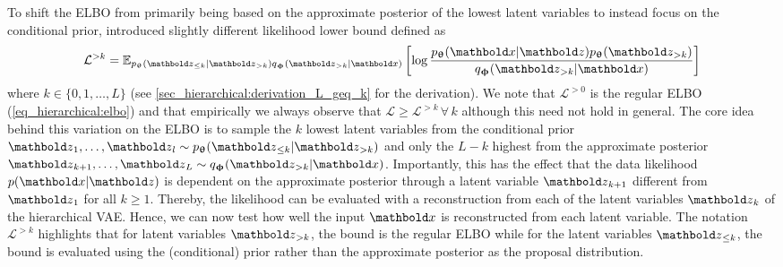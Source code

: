 {To shift the ELBO from primarily being based on the approximate posterior of the lowest latent variables to instead focus on the conditional prior, \textcite{maaloe_biva_2019} introduced slightly different likelihood lower bound defined as
\begin{equation}\label{eq_hierarchical:biva->k}
    \mathcal{L}^{>k} = \mathbb{E}_{p_\thetab(\zb_{\leq k}|\zb_{>k}) q_\phib(\zb_{>k}|\xb)} \left[ \log \frac{p_\thetab(\xb|\zb)p_\thetab(\zb_{>k})}{q_\phib(\zb_{>k}|\xb)} \right]
\end{equation}
where $k\in\{0,1,\dots,L\}$ (see \cref{sec_hierarchical:derivation_L_geq_k} for the derivation).
We note that $\mathcal{L}^{>0}$ is the regular ELBO (\cref{eq_hierarchical:elbo}) and that empirically we always observe that $\mathcal{L}\geq\mathcal{L}^{>k} \, \forall \, k$ although this need not hold in general.
The core idea behind this variation on the ELBO is to sample the $k$ lowest latent variables from the conditional prior $\zb_1,\dots,\zb_l \sim p_\thetab(\zb_{\leq k}|\zb_{>k})$ and only the $L-k$ highest from the approximate posterior $\zb_{k+1},\dots,\zb_L \sim q_\phib(\zb_{>k}|\xb)$.
Importantly, this has the effect that the data likelihood $p(\xb|\zb)$ is dependent on the approximate posterior through a latent variable $\zb_{k+1}$ different from $\zb_1$ for all $k \geq 1$.
Thereby, the likelihood can be evaluated with a reconstruction from each of the latent variables $\zb_k$ of the hierarchical VAE.
Hence, we can now test how well the input $\xb$ is reconstructed from each latent variable.
The notation $\mathcal{L}^{>k}$ highlights that for latent variables $\zb_{>k}$, the bound is the regular ELBO while for the latent variables $\zb_{\leq k}$, the bound is evaluated using the (conditional) prior rather than the approximate posterior as the proposal distribution.


}
